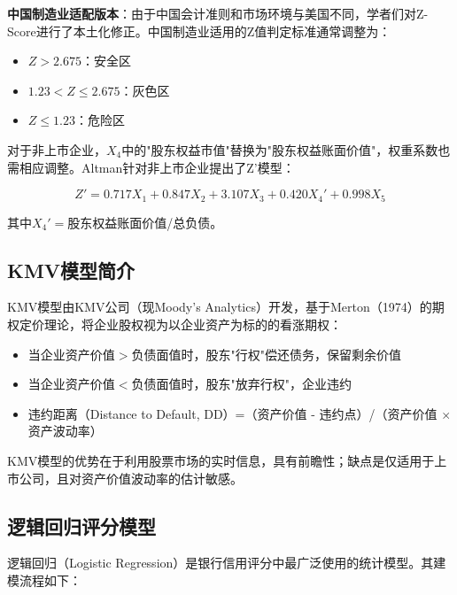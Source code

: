 \textbf{中国制造业适配版本}：由于中国会计准则和市场环境与美国不同，学者们对Z-Score进行了本土化修正。中国制造业适用的Z值判定标准通常调整为：

\begin{itemize}[leftmargin=2em]
  \item $Z > 2.675$：安全区
  \item $1.23 < Z \leq 2.675$：灰色区
  \item $Z \leq 1.23$：危险区
\end{itemize}

对于非上市企业，$X_4$中的"股东权益市值"替换为"股东权益账面价值"，权重系数也需相应调整。Altman针对非上市企业提出了Z'模型：

\[
Z' = 0.717 X_1 + 0.847 X_2 + 3.107 X_3 + 0.420 X_4' + 0.998 X_5
\]

其中$X_4' = $股东权益账面价值/总负债。

\subsection{KMV模型简介}

KMV模型由KMV公司（现Moody's Analytics）开发，基于Merton（1974）的期权定价理论，将企业股权视为以企业资产为标的的看涨期权：

\begin{itemize}[leftmargin=2em]
  \item 当企业资产价值$>$负债面值时，股东"行权"偿还债务，保留剩余价值
  \item 当企业资产价值$<$负债面值时，股东"放弃行权"，企业违约
  \item 违约距离（Distance to Default, DD）=（资产价值 - 违约点）/（资产价值 $\times$ 资产波动率）
\end{itemize}

KMV模型的优势在于利用股票市场的实时信息，具有前瞻性；缺点是仅适用于上市公司，且对资产价值波动率的估计敏感。

\subsection{逻辑回归评分模型}

逻辑回归（Logistic Regression）是银行信用评分中最广泛使用的统计模型。其建模流程如下：

